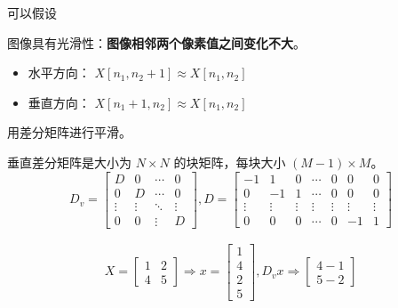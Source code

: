 可以假设

\begin{proposition}[图像逆问题先验假设]
    图像具有光滑性：\textbf{图像相邻两个像素值之间变化不大}。

    \begin{itemize}
    \item 水平方向： $ X\left[n_{1}, n_{2}+1\right] \approx X\left[n_{1}, n_{2}\right] $
    \item 垂直方向： $ X\left[n_{1}+1, n_{2}\right] \approx X\left[n_{1}, n_{2}\right] $
\end{itemize}
\end{proposition}


用差分矩阵进行平滑。

\begin{definition}[垂直差分矩阵]
    
    垂直差分矩阵是大小为 $ N \times N $ 的块矩阵，每块大小 $ (M-1)   \times M $。
    $$D_{v}=\left[\begin{array}{cccc}
        D & 0 & \cdots & 0 \\
        0 & D & \cdots & 0 \\
        \vdots & \vdots & \ddots & \vdots \\
        0 & 0 & \vdots & D
        \end{array}\right], D=\left[\begin{array}{ccccccc}
        -1 & 1 & 0 & \cdots & 0 & 0 & 0 \\
        0 & -1 & 1 & \cdots & 0 & 0 & 0 \\
        \vdots & \vdots & \vdots & \vdots & \vdots & \vdots & \vdots \\
        0 & 0 & 0 & \cdots & 0 & -1 & 1
        \end{array}\right] $$
\end{definition}

\begin{example}
$$
\begin{array}{c}
X=\left[\begin{array}{ll}
1 & 2 \\
4 & 5
\end{array}\right] \Rightarrow x=\left[\begin{array}{l}
1 \\
4 \\
2 \\
5
\end{array}\right], D_{v} x \Rightarrow\left[\begin{array}{l}
4-1 \\
5-2
\end{array}\right]
\end{array}
$$
\end{example}

